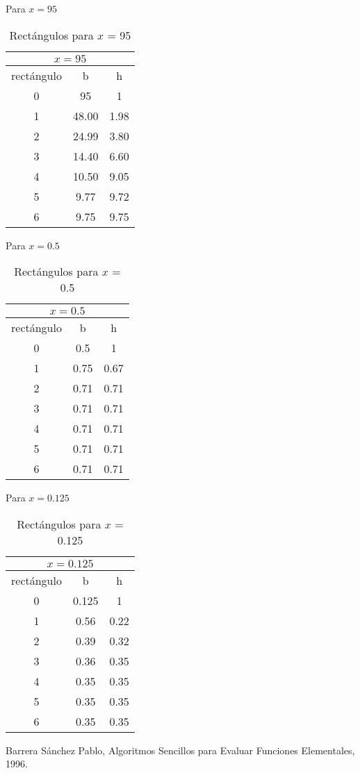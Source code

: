 \documentclass[letter,12pt]{article}
\begin{document}
Para $x = 95$
\begin{table}[h!]
	\centering
	\begin{tabular}{ |c|c|c| } 
		\multicolumn{3}{c}{$x = 95$}\\
		\hline
		rectángulo & b & h \\
		\hline
		0& 95	& 1\\
		1&     48.00&  1.98\\
		2&     24.99&  3.80\\
		3&     14.40&  6.60\\
		4&     10.50&  9.05\\
		5&      9.77&  9.72\\
		6&      9.75&  9.75\\
		\hline
	\end{tabular}
	\caption{Rectángulos para $x$ = 95 }
	\label{table:1}
\end{table}
\newpage
Para $x = 0.5$
\begin{table}[h!]
	\centering
	\begin{tabular}{ |c|c|c| } 
		\multicolumn{3}{c}{$x = 0.5$}\\
		\hline
		rectángulo & b & h \\
		\hline
		0& 0.5	& 1\\
		1&      0.75&  0.67\\
		2&      0.71&  0.71\\
		3&      0.71&  0.71\\
		4&      0.71&  0.71\\
		5&      0.71&  0.71\\
		6&      0.71&  0.71\\
		\hline
	\end{tabular}
	\caption{Rectángulos para $x$ = 0.5 }
	\label{table:1}
\end{table}

Para $x = 0.125$
\begin{table}[h!]
	\centering
	\begin{tabular}{ |c|c|c| } 
		\multicolumn{3}{c}{$x = 0.125$}\\
		\hline
		rectángulo & b & h \\
		\hline
		0& 0.125	& 1\\
		1&      0.56&  0.22\\
		2&      0.39&  0.32\\
		3&      0.36&  0.35\\
		4&      0.35&  0.35\\
		5&      0.35&  0.35\\
		6&      0.35&  0.35\\
		\hline
	\end{tabular}
	\caption{Rectángulos para $x$ = 0.125 }
	\label{table:1}
\end{table}

\begin{thebibliography}{0}
	Barrera Sánchez Pablo, Algoritmos Sencillos para Evaluar Funciones Elementales, 1996.
\end{thebibliography}
\end{document}

